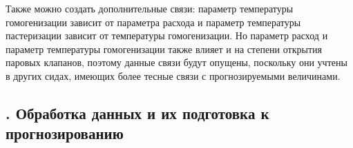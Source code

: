 {  \par \redline Также можно создать дополнительные связи: параметр температуры гомогенизации зависит от параметра расхода и параметр температуры пастеризации зависит от температуры гомогенизации. Но параметр расход и параметр температуры гомогенизации также влияет и на степени открытия паровых клапанов, поэтому данные связи будут опущены, поскольку они учтены в других сидах, имеющих более тесные связи с прогнозируемыми величинами.    

  \par 
}

\titlespace

\subsection*{ 
  \gostTitleFont
  \redline
  \thechaptercntr .\thesubchaptercntr \spc
  Обработка данных и их подготовка к прогнозированию
} \addtocounter{subchaptercntr}{1}

\titlespace

